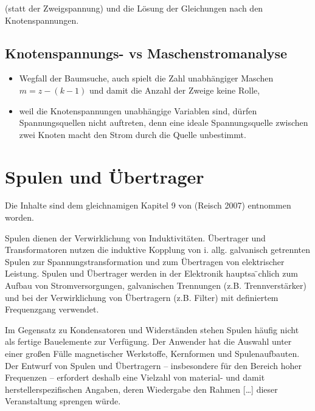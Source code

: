 \documentclass[
  ngerman,
  letterpaper,
]{scrbook}
\begin{document}
(statt der Zweigspannung) und die Lösung der Gleichungen nach den
Knotenspannungen.

\section{Knotenspannungs- vs
Maschenstromanalyse}\label{knotenspannungs--vs-maschenstromanalyse}

\begin{itemize}
\item
  Wegfall der Baumsuche, auch spielt die Zahl unabhängiger Maschen
  \(m = z-(k-1)\) und damit die Anzahl der Zweige keine Rolle,
\item
  weil die Knotenspannungen unabhängige Variablen sind, dürfen
  Spannungsquellen nicht auftreten, denn eine ideale Spannungsquelle
  zwischen zwei Knoten macht den Strom durch die Quelle unbestimmt.
\end{itemize}

\chapter{Spulen und Übertrager}\label{spulen-und-uxfcbertrager}

\begin{tcolorbox}[enhanced jigsaw, titlerule=0mm, rightrule=.15mm, toprule=.15mm, colback=white, toptitle=1mm, bottomrule=.15mm, coltitle=black, leftrule=.75mm, arc=.35mm, colbacktitle=quarto-callout-note-color!10!white, opacityback=0, bottomtitle=1mm, colframe=quarto-callout-note-color-frame, opacitybacktitle=0.6, breakable, title=\textcolor{quarto-callout-note-color}{\faInfo}\hspace{0.5em}{Hinweis}, left=2mm]

Die Inhalte sind dem gleichnamigen Kapitel 9 von (Reisch 2007) entnommen
worden.

\end{tcolorbox}

Spulen dienen der Verwirklichung von Induktivitäten. Übertrager und
Transformatoren nutzen die induktive Kopplung von i. allg. galvanisch
getrennten Spulen zur Spannungstransformation und zum Übertragen von
elektrischer Leistung. Spulen und Übertrager werden in der Elektronik
hauptsa ̈chlich zum Aufbau von Stromversorgungen, galvanischen
Trennungen (z.B. Trennverstärker) und bei der Verwirklichung von
Übertragern (z.B. Filter) mit definiertem Frequenzgang verwendet.

Im Gegensatz zu Kondensatoren und Widerständen stehen Spulen häufig
nicht als fertige Bauelemente zur Verfügung. Der Anwender hat die
Auswahl unter einer großen Fülle magnetischer Werkstoffe, Kernformen und
Spulenaufbauten. Der Entwurf von Spulen und Übertragern -- insbesondere
für den Bereich hoher Frequenzen -- erfordert deshalb eine Vielzahl von
material- und damit herstellerspezifischen Angaben, deren Wiedergabe den
Rahmen {[}\ldots{]} dieser Veranstaltung sprengen würde.
\end{document}
